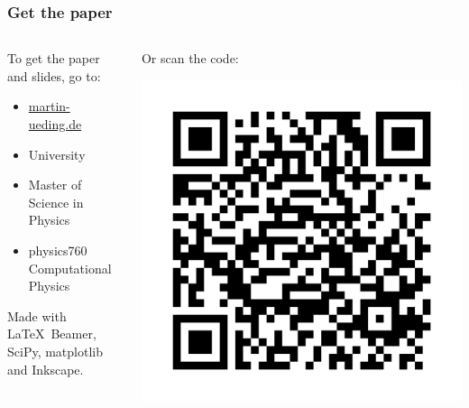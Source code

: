 \documentclass[english, fleqn]{beamer}
\begin{document}
\begin{frame}
    \frametitle{Get the paper}

    \begin{columns}[t]
        \begin{column}{0.5\linewidth}
            To get the paper and slides, go to:
            \begin{itemize}
                \item \href{http://martin-ueding.de/en/university/msc_physics/physics760/index.html}{martin-ueding.de}
                \item University
                \item Master of Science in Physics
                \item physics760 Computational~Physics
            \end{itemize}

            \vspace{2cm}
            Made with \LaTeX\ Beamer, SciPy, matplotlib and Inkscape.
        \end{column}
        \begin{column}{0.5\linewidth}
            Or scan the code:
            \begin{center}
                \includegraphics[width=\linewidth]{physics760.png}
            \end{center}
        \end{column}
    \end{columns}

\end{frame}
\end{document}
